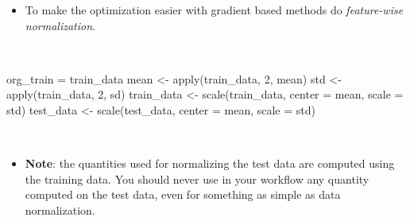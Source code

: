 \documentclass[
  10pt,
  ignorenonframetext,
]{beamer}
\newenvironment{Shaded}{\begin{snugshade}}{\end{snugshade}}
\newcommand{\AttributeTok}[1]{\textcolor[rgb]{0.77,0.63,0.00}{#1}}
\newcommand{\DecValTok}[1]{\textcolor[rgb]{0.00,0.00,0.81}{#1}}
\newcommand{\FunctionTok}[1]{\textcolor[rgb]{0.00,0.00,0.00}{#1}}
\newcommand{\NormalTok}[1]{#1}
\newcommand{\OtherTok}[1]{\textcolor[rgb]{0.56,0.35,0.01}{#1}}
\providecommand{\tightlist}{%
  \setlength{\itemsep}{0pt}\setlength{\parskip}{0pt}}
\begin{document}
\begin{frame}[fragile]
\begin{itemize}
\tightlist
\item
  To make the optimization easier with gradient based methods do
  \emph{feature-wise normalization}.
\end{itemize}

\(~\)

\scriptsize

\begin{Shaded}
\begin{Highlighting}[]
\NormalTok{org\_train }\OtherTok{=}\NormalTok{ train\_data}
\NormalTok{mean }\OtherTok{\textless{}{-}} \FunctionTok{apply}\NormalTok{(train\_data, }\DecValTok{2}\NormalTok{, mean)}
\NormalTok{std }\OtherTok{\textless{}{-}} \FunctionTok{apply}\NormalTok{(train\_data, }\DecValTok{2}\NormalTok{, sd)}
\NormalTok{train\_data }\OtherTok{\textless{}{-}} \FunctionTok{scale}\NormalTok{(train\_data, }\AttributeTok{center =}\NormalTok{ mean, }\AttributeTok{scale =}\NormalTok{ std)}
\NormalTok{test\_data }\OtherTok{\textless{}{-}} \FunctionTok{scale}\NormalTok{(test\_data, }\AttributeTok{center =}\NormalTok{ mean, }\AttributeTok{scale =}\NormalTok{ std)}
\end{Highlighting}
\end{Shaded}

\(~\)

\normalsize

\begin{itemize}
\tightlist
\item
  \textbf{Note}: the quantities used for normalizing the test data are
  computed using the training data. You should never use in your
  workflow any quantity computed on the test data, even for something as
  simple as data normalization.
\end{itemize}
\end{frame}
\end{document}
